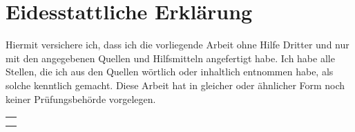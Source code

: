 
\thispagestyle{empty}
\section*{Eidesstattliche Erklärung}
Hiermit versichere ich, dass ich die vorliegende Arbeit ohne Hilfe Dritter und nur mit den angegebenen Quellen und Hilfsmitteln angefertigt habe.
Ich habe alle Stellen, die ich aus den Quellen wörtlich oder inhaltlich entnommen habe, als solche kenntlich gemacht. Diese Arbeit hat in gleicher oder ähnlicher Form noch keiner Prüfungsbehörde vorgelegen.

\vspace{5em}

\begin{flushleft}
	\begin{tabular}{l}
		\hline \\
		\author, \location, den \date
	\end{tabular}
\end{flushleft}